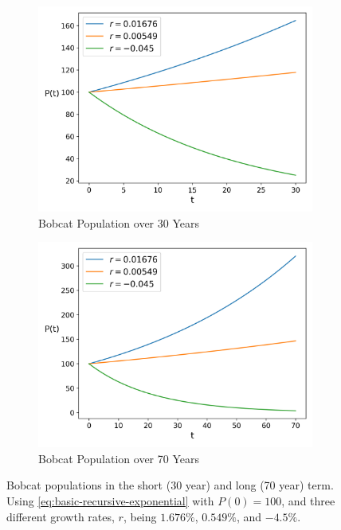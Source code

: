\documentclass{article}
\begin{document}
\begin{figure}[h]
    \centering
    \begin{subfigure}{.5\textwidth}
        \centering
        \includegraphics[width=.95\linewidth]{./basic/short_term.png}
        \caption{Bobcat Population over 30 Years}
        \label{fig:basic-short-term}
    \end{subfigure}%
    \begin{subfigure}{.5\textwidth}
        \centering
        \includegraphics[width=.95\linewidth]{./basic/long_term.png}
        \caption{Bobcat Population over 70 Years}
        \label{fig:basic-long-term}
    \end{subfigure}
    \caption{Bobcat populations in the short (30 year) and long (70 year) term. Using \autoref{eq:basic-recursive-exponential} with $P(0) = 100$, and three different growth rates, $r$, being $1.676\%$, $0.549\%$, and $-4.5\%$.\protect\footnotemark{}}
    \label{fig:test}
\end{figure}
\end{document}
